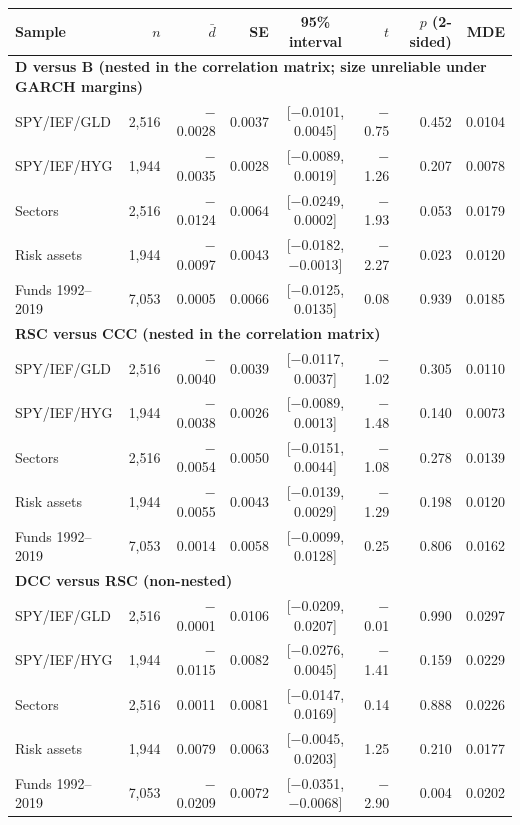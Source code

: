 \begin{table}[t]
\centering{}\footnotesize\setlength{\tabcolsep}{5pt}
\caption{}\label{tab:ladder-corr}
\begin{tabular}{lrrrcrrr}
\toprule
Sample & $n$ & $\bar d$ & SE & 95\% interval & $t$ & $p$ (2-sided) & MDE \\
\midrule
\multicolumn{8}{l}{\textbf{D versus B (nested in the correlation matrix; size unreliable under GARCH margins)}}\\
SPY/IEF/GLD & 2,516 & $-$0.0028 & 0.0037 & [$-$0.0101, 0.0045] & $-$0.75 & 0.452 & 0.0104 \\
SPY/IEF/HYG & 1,944 & $-$0.0035 & 0.0028 & [$-$0.0089, 0.0019] & $-$1.26 & 0.207 & 0.0078 \\
Sectors & 2,516 & $-$0.0124 & 0.0064 & [$-$0.0249, 0.0002] & $-$1.93 & 0.053 & 0.0179 \\
Risk assets & 1,944 & $-$0.0097 & 0.0043 & [$-$0.0182, $-$0.0013] & $-$2.27 & 0.023 & 0.0120 \\
Funds 1992--2019 & 7,053 & 0.0005 & 0.0066 & [$-$0.0125, 0.0135] & 0.08 & 0.939 & 0.0185 \\
\midrule
\multicolumn{8}{l}{\textbf{RSC versus CCC (nested in the correlation matrix)}}\\
SPY/IEF/GLD & 2,516 & $-$0.0040 & 0.0039 & [$-$0.0117, 0.0037] & $-$1.02 & 0.305 & 0.0110 \\
SPY/IEF/HYG & 1,944 & $-$0.0038 & 0.0026 & [$-$0.0089, 0.0013] & $-$1.48 & 0.140 & 0.0073 \\
Sectors & 2,516 & $-$0.0054 & 0.0050 & [$-$0.0151, 0.0044] & $-$1.08 & 0.278 & 0.0139 \\
Risk assets & 1,944 & $-$0.0055 & 0.0043 & [$-$0.0139, 0.0029] & $-$1.29 & 0.198 & 0.0120 \\
Funds 1992--2019 & 7,053 & 0.0014 & 0.0058 & [$-$0.0099, 0.0128] & 0.25 & 0.806 & 0.0162 \\
\midrule
\multicolumn{8}{l}{\textbf{DCC versus RSC (non-nested)}}\\
SPY/IEF/GLD & 2,516 & $-$0.0001 & 0.0106 & [$-$0.0209, 0.0207] & $-$0.01 & 0.990 & 0.0297 \\
SPY/IEF/HYG & 1,944 & $-$0.0115 & 0.0082 & [$-$0.0276, 0.0045] & $-$1.41 & 0.159 & 0.0229 \\
Sectors & 2,516 & 0.0011 & 0.0081 & [$-$0.0147, 0.0169] & 0.14 & 0.888 & 0.0226 \\
Risk assets & 1,944 & 0.0079 & 0.0063 & [$-$0.0045, 0.0203] & 1.25 & 0.210 & 0.0177 \\
Funds 1992--2019 & 7,053 & $-$0.0209 & 0.0072 & [$-$0.0351, $-$0.0068] & $-$2.90 & 0.004 & 0.0202 \\
\bottomrule
\end{tabular}
\end{table}

